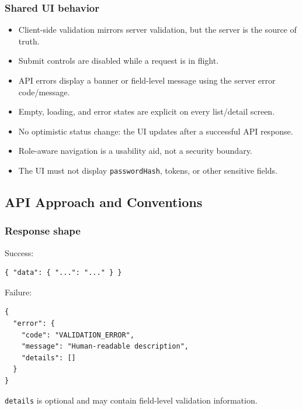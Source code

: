 \documentclass[11pt,a4paper]{article}
\begin{document}
\subsubsection{Shared UI behavior}

\begin{itemize}[leftmargin=*,itemsep=2pt,topsep=2pt]
  \item Client-side validation mirrors server validation, but the server is the source of truth.
  \item Submit controls are disabled while a request is in flight.
  \item API errors display a banner or field-level message using the server error code/message.
  \item Empty, loading, and error states are explicit on every list/detail screen.
  \item No optimistic status change: the UI updates after a successful API response.
  \item Role-aware navigation is a usability aid, not a security boundary.
  \item The UI must not display \texttt{passwordHash}, tokens, or other sensitive fields.
\end{itemize}

\subsection{API Approach and Conventions}

\subsubsection{Response shape}

Success:\\

\begin{lstlisting}[basicstyle=\ttfamily\scriptsize]
{ "data": { "...": "..." } }
\end{lstlisting}

Failure:\\

\begin{lstlisting}[basicstyle=\ttfamily\scriptsize]
{
  "error": {
    "code": "VALIDATION_ERROR",
    "message": "Human-readable description",
    "details": []
  }
}
\end{lstlisting}

\texttt{details} is optional and may contain field-level validation information.\\
\end{document}
